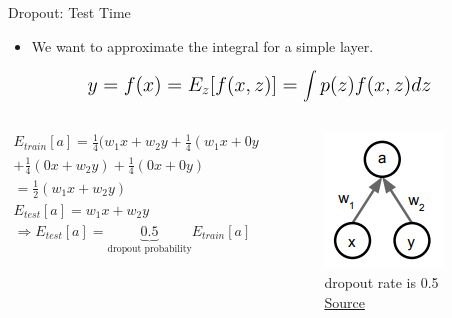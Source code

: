 \begin{frame}{Dropout: Test Time}
	\begin{itemize}
		\item We want to approximate the integral for a simple layer.
	\end{itemize}
	\begin{equation*}
		\mathlarger{\mathlarger{
			y = f(x) = E_z[f(x, z)] = \int p(z)f(x, z) dz
		}}
	\end{equation*}
	\begin{columns}
		\begin{column}{0.5\textwidth}
			\begin{align*}
				E_{train}[a] = \frac{1}{4}(w_1 x + w_2 y
				+ \frac{1}{4}(w_1 x + 0 y) \\
				+ \frac{1}{4}(0 x + w_2 y) + \frac{1}{4}(0 x + 0 y) \\
				= \frac{1}{2}(w_1 x + w_2 y) \\
				E_{test}[a] = w_1 x + w_2 y \\
				\Rightarrow E_{test}[a] = \underbrace{0.5}_{\text{dropout probability}} E_{train}[a]
			\end{align*}
		\end{column}
		\begin{column}{0.5\textwidth}
			\begin{figure}[H]
				\centering
				\includegraphics[height=0.4\textheight]{Figs/section_4/dropout_test.png}
				\caption{dropout rate is 0.5 \href{https://www.cs.toronto.edu/~hinton/absps/JMLRdropout.pdf}{Source}}
			\end{figure}
		\end{column}
	\end{columns}
\end{frame}



